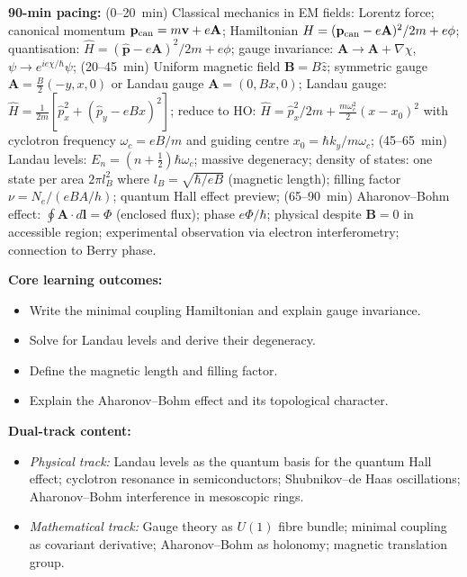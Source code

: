 \documentclass[11pt,a4paper]{article}
\begin{document}
\begin{tcolorbox}[modulebox, title={Module~I.4 / L05: Minimal Coupling Hamiltonian and Landau Levels}]
\textbf{90-min pacing:} (0--20~min) Classical mechanics in EM fields: Lorentz force;
canonical momentum $\mathbf{p}_{\rm can}=m\mathbf{v}+e\mathbf{A}$;
Hamiltonian $H=(\mathbf{p}_{\rm can}-e\mathbf{A})^2/2m+e\phi$;
quantisation: $\hat{H}=(\hat{\mathbf{p}}-e\mathbf{A})^2/2m+e\phi$;
gauge invariance: $\mathbf{A}\to\mathbf{A}+\nabla\chi$, $\psi\to e^{ie\chi/\hbar}\psi$;
(20--45~min) Uniform magnetic field $\mathbf{B}=B\hat{z}$;
symmetric gauge $\mathbf{A}=\tfrac{B}{2}(-y,x,0)$ or Landau gauge $\mathbf{A}=(0,Bx,0)$;
Landau gauge: $\hat{H}=\tfrac{1}{2m}[\hat{p}_x^2+(\hat{p}_y-eBx)^2]$;
reduce to HO: $\hat{H}=\hat{p}_x^2/2m+\tfrac{m\omega_c^2}{2}(x-x_0)^2$
with cyclotron frequency $\omega_c=eB/m$ and guiding centre $x_0=\hbar k_y/m\omega_c$;
(45--65~min) Landau levels: $E_n=(n+\tfrac{1}{2})\hbar\omega_c$; massive degeneracy;
density of states: one state per area $2\pi l_B^2$ where $l_B=\sqrt{\hbar/eB}$ (magnetic length);
filling factor $\nu=N_e/(eBA/h)$; quantum Hall effect preview;
(65--90~min) Aharonov--Bohm effect: $\oint\mathbf{A}\cdot d\mathbf{l}=\Phi$ (enclosed flux);
phase $e\Phi/\hbar$; physical despite $\mathbf{B}=0$ in accessible region;
experimental observation via electron interferometry; connection to Berry phase.

\medskip\textbf{Core learning outcomes:}
\begin{itemize}[leftmargin=1.4em,topsep=2pt,itemsep=1pt]
  \item Write the minimal coupling Hamiltonian and explain gauge invariance.
  \item Solve for Landau levels and derive their degeneracy.
  \item Define the magnetic length and filling factor.
  \item Explain the Aharonov--Bohm effect and its topological character.
\end{itemize}

\medskip\textbf{Dual-track content:}
\begin{itemize}[leftmargin=1.4em,topsep=2pt,itemsep=1pt]
  \item \textit{Physical track:} Landau levels as the quantum basis for the quantum Hall effect;
    cyclotron resonance in semiconductors; Shubnikov--de Haas oscillations;
    Aharonov--Bohm interference in mesoscopic rings.
  \item \textit{Mathematical track:} Gauge theory as $U(1)$ fibre bundle; minimal coupling as
    covariant derivative; Aharonov--Bohm as holonomy; magnetic translation group.
\end{itemize}


\end{tcolorbox}
\end{document}
